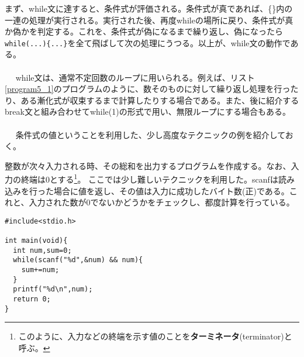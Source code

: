 まず、while文に達すると、条件式が評価される。条件式が真であれば、\{\}内の一連の処理が実行される。実行された後、再度whileの場所に戻り、条件式が真か偽かを判定する。これを、条件式が偽になるまで繰り返し、偽になったら\verb|while(...){...}|を全て飛ばして次の処理にうつる。以上が、while文の動作である。
\\ \\　
while文は、通常不定回数のループに用いられる。例えば、リスト\ref{program5_1}のプログラムのように、数そのものに対して繰り返し処理を行ったり、ある漸化式が収束するまで計算したりする場合である。また、後に紹介するbreak文と組み合わせてwhile(1)の形式で用い、無限ループにする場合もある。
\\ \\　
条件式の値ということを利用した、少し高度なテクニックの例を紹介しておく。
\begin{boxnote}
\begin{multicols}{2}
整数が次々入力される時、その総和を出力するプログラムを作成する。なお、入力の終端は0とする\footnote{このように、入力などの終端を示す値のことを\textbf{ターミネータ}(terminator)と呼ぶ。}。
ここでは少し難しいテクニックを利用した。scanfは読み込みを行った場合に値を返し、その値は入力に成功したバイト数(正)である。これと、入力された数が0でないかどうかをチェックし、都度計算を行っている。
\begin{lstlisting}[caption=ターミネータによる総和計算,label=program5_2]
#include<stdio.h>

int main(void){
  int num,sum=0;
  while(scanf("%d",&num) && num){
    sum+=num;
  }
  printf("%d\n",num);
  return 0;
}
\end{lstlisting}
\end{multicols}
\end{boxnote}

